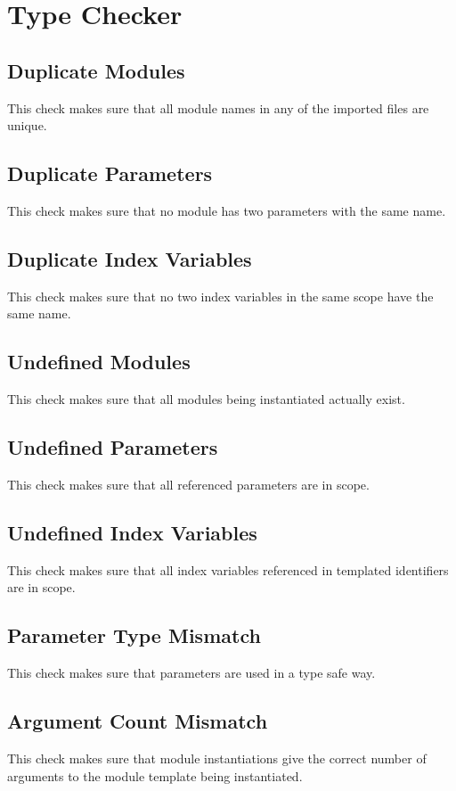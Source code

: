 \documentclass[a4paper,11pt,twoside]{report}
\begin{document}
{{{\section{Type Checker}
\subsection{Duplicate Modules}
This check makes sure that all module names in any of the imported files are unique.

\subsection{Duplicate Parameters}
This check makes sure that no module has two parameters with the same name.

\subsection{Duplicate Index Variables}
This check makes sure that no two index variables in the same scope have the same name.

\subsection{Undefined Modules}
This check makes sure that all modules being instantiated actually exist.

\subsection{Undefined Parameters}
This check makes sure that all referenced parameters are in scope.

\subsection{Undefined Index Variables}
This check makes sure that all index variables referenced in templated identifiers are in scope. 

\subsection{Parameter Type Mismatch}
This check makes sure that parameters are used in a type safe way.

\subsection{Argument Count Mismatch}
This check makes sure that module instantiations give the correct number of arguments to the module template being instantiated.

}}}
\end{document}
